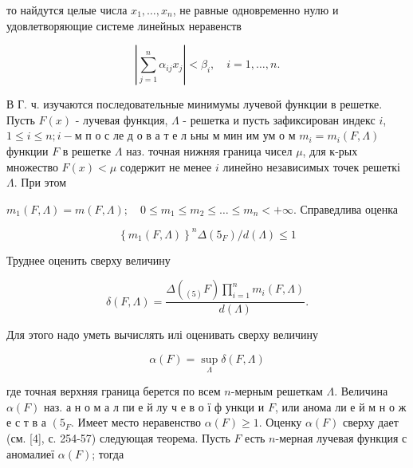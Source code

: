 \documentclass[10pt]{article}
\begin{document}
то найдутся целые числа $x_{1}, \ldots, x_{n}$, не равные одновременно нулю и удовлетворяющие системе линейных неравенств



\[

\left|\sum_{j=1}^{n} \alpha_{i j} x_{j}\right|<\beta_{i}, \quad i=1, \ldots, n .

\]



В Г. ч. изучаются последовательные минимумы лучевой функции в решетке. Пусть $F(x)$ - лучевая функция, $\Lambda$ - решетка и пусть зафиксирован индекс $i$, $1 \leqslant i \leqslant n ; i-\mathbf{м}$ п о с ле д о в а т е л ьны м мин им ум о м $m_{i}=m_{i}(F, \Lambda)$ функции $F$ в решетке $\Lambda$ наз. точная нижняя граница чисел $\mu$, для к-рых множество $F(x)<\mu$ содержит не менее $i$ линейно независимых точек решеткі $\Lambda$. При этом



$m_{1}(F, \Lambda)=m(F, \Lambda) ; \quad 0 \leqslant m_{1} \leqslant m_{2} \leqslant \ldots \leqslant m_{n}<+\infty$. Справедлива оценка



\[

\left\{m_{1}(F, \Lambda)\right\}^{n} \Delta\left(5_{F}\right) / d(\Lambda) \leqslant 1

\]



Труднее оценить сверху величину



\[

\delta(F, \Lambda)=\frac{\Delta\left({ }_{(5)} F\right) \prod_{i=1}^{n} m_{i}(F, \Lambda)}{d(\Lambda)} .

\]



Для этого надо уметь вычислять илі оценивать сверху величину



\[

\alpha(F)=\sup _{\Lambda} \delta(F, \Lambda)

\]



где точная верхняя граница берется по всем $n$-мерным решеткам $\Lambda$. Величина $\alpha(F)$ наз. а н о м а л пи е й лу ч е в о ї ф ункци и $F$, или анома ли е й м н о ж е с т в а $\left(5_{F}\right.$. Имеет место неравенство $\alpha(F) \geqslant 1$. Оценку $\alpha(F)$ сверху дает (см. [4], с. 254-57) следующая теорема. Пусть $F$ есть $n$-мерная лучевая функция с аномалиеї $\alpha(F)$; тогда
\end{document}
